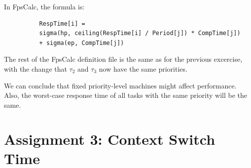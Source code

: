 \documentclass[a4paper,10pt]{article}
\begin{document}
\begin{enumerate}
	In FpsCalc, the formula is:
	
	\begin{lstlisting}
          RespTime[i] =
          sigma(hp, ceiling(RespTime[i] / Period[j]) * CompTime[j])
          + sigma(ep, CompTime[j])
	\end{lstlisting}

        The rest of the FpsCalc definition file is the same as for the previous excercise, with the change that $\tau_2$ and $\tau_3$ now have the same priorities.
	
	We can conclude that fixed priority-level machines might affect performance. Also, the worst-case response time of all tasks with the same priority will be the same.
	
\end{enumerate}

\section{Assignment 3: Context Switch Time}
\end{document}
